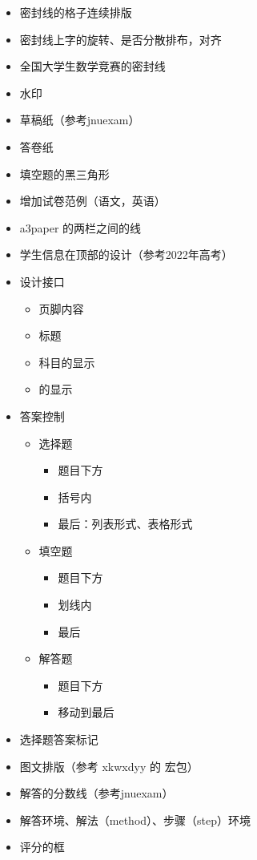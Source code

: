 \documentclass{ccnudoc}
\begin{document}
\begin{itemize}
  \item 密封线的格子连续排版
  \item 密封线上字的旋转、是否分散排布，对齐
  \item 全国大学生数学竞赛的密封线
  \item 水印
  \item 草稿纸（参考jnuexam）
  \item 答卷纸
  \item 填空题的黑三角形
  \item 增加试卷范例（语文，英语）
  \item a3paper 的两栏之间的线
    \begin{latexcode}[gobble = 6]
      \setlength{\columnseprule}{0.4pt}
    \end{latexcode}
  \item 学生信息在顶部的设计（参考2022年高考）
  \item 设计接口
    \begin{itemize}
      \item 页脚内容
      \item 标题
      \item 科目的显示
      \item {} 的显示
    \end{itemize}
  \item 答案控制
    \begin{itemize}
      \item 选择题
        \begin{itemize}
          \item 题目下方
          \item 括号内
          \item 最后：列表形式、表格形式
        \end{itemize}
      \item 填空题
        \begin{itemize}
          \item 题目下方
          \item 划线内
          \item 最后
        \end{itemize}
      \item 解答题
        \begin{itemize}
          \item 题目下方
          \item 移动到最后
        \end{itemize}
    \end{itemize}
  \item 选择题答案标记
  \item 图文排版（参考 xkwxdyy 的  宏包）
  \item 解答的分数线（参考jnuexam）
  \item 解答环境、解法（method）、步骤（step）环境
  \item 评分的框
\end{itemize}

\end{document}
